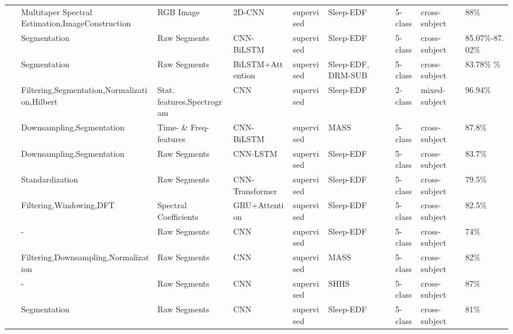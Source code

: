 \begin{table*}[ht]
\begin{tabular}{p{0.4cm}p{2.8cm}p{2cm}p{1.5cm}p{1.9cm}p{1.9cm}p{0.8cm}p{1.8cm}p{2cm}}
~\cite{vilamala2017deep} &  Multitaper Spectral \newline Estimation,Image\newline Construction & RGB Image & 2D-CNN & supervised & Sleep-EDF & 5-class  & cross-subject & 88\% \\
~\cite{Sleep23} & Segmentation & Raw Segments & CNN-BiLSTM & supervised & Sleep-EDF & 5-class & cross-subject & 85.07\%-87.02\% \\
~\cite{Sleep24} & Segmentation & Raw Segments & BiLSTM\newline +Attention & supervised & Sleep-EDF, \newline DRM-SUB & 5-class & cross-subject & 83.78\% \newline
81.72\% \\
~\cite{Sleep25} & Filtering,Segmentation,\newline Normalization,Hilbert & Stat. features,\newline Spectrogram & CNN & supervised & Sleep-EDF & 2-class & mixed-subject & 96.94\% \\
~\cite{Sleep27} & Downsampling,\newline Segmentation & Time- \& Freq- features & CNN-BiLSTM & supervised & MASS & 5-class & cross-subject & 87.8\% \\
~\cite{Sleep28} & Downsampling,\newline Segmentation & Raw Segments & CNN-LSTM & supervised & Sleep-EDF & 5-class & cross-subject & 83.7\% \\
~\cite{yao2023cnntransformer} & Standardization & Raw Segments & CNN-Transformer & supervised & Sleep-EDF & 5-class & cross-subject & 79.5\% \\
~\cite{phan2018automatic} & Filtering,Windowing,DFT & Spectral Coefficients & GRU+Attention & supervised & Sleep-EDF & 5-class & cross-subject & 82.5\% \\
~\cite{tsinalis2016automatic} & - & Raw Segments & CNN & supervised & Sleep-EDF & 5-class  & cross-subject & 74\% \\
~\cite{chambon2018deep} & Filtering,Downsampling,\newline Normalization & Raw Segments & CNN & supervised & MASS & 5-class  & cross-subject & 82\% \\
~\cite{Sleep33} & - & Raw Segments & CNN & supervised & SHHS & 5-class  & cross-subject & 87\% \\
~\cite{Sleep34} & Segmentation & Raw Segments & CNN & supervised & Sleep-EDF & 5-class  & cross-subject & 81\% \\

\hline
\end{tabular}
\end{table*}


